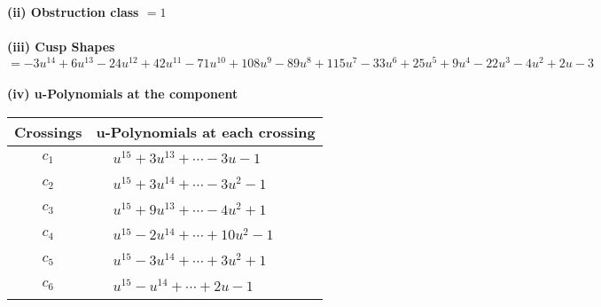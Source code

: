 \documentclass[1p]{elsarticle_modified}
\theoremstyle{definition}
\begin{document}
\flushleft \textbf{(ii) Obstruction class $= 1$}\\~\\
\flushleft \textbf{(iii) Cusp Shapes $= -3 u^{14}+6 u^{13}-24 u^{12}+42 u^{11}-71 u^{10}+108 u^9-89 u^8+115 u^7-33 u^6+25 u^5+9 u^4-22 u^3-4 u^2+2 u-3$}\\~\\
\newpage\renewcommand{\arraystretch}{1}
\flushleft \textbf{(iv) u-Polynomials at the component}\newline \\
\begin{tabular}{m{50pt}|m{274pt}}
Crossings & \hspace{64pt}u-Polynomials at each crossing \\
\hline $$\begin{aligned}c_{1}\end{aligned}$$&$\begin{aligned}
&u^{15}+3 u^{13}+\cdots-3 u-1
\end{aligned}$\\
\hline $$\begin{aligned}c_{2}\end{aligned}$$&$\begin{aligned}
&u^{15}+3 u^{14}+\cdots-3 u^2-1
\end{aligned}$\\
\hline $$\begin{aligned}c_{3}\end{aligned}$$&$\begin{aligned}
&u^{15}+9 u^{13}+\cdots-4 u^2+1
\end{aligned}$\\
\hline $$\begin{aligned}c_{4}\end{aligned}$$&$\begin{aligned}
&u^{15}-2 u^{14}+\cdots+10 u^2-1
\end{aligned}$\\
\hline $$\begin{aligned}c_{5}\end{aligned}$$&$\begin{aligned}
&u^{15}-3 u^{14}+\cdots+3 u^2+1
\end{aligned}$\\
\hline $$\begin{aligned}c_{6}\end{aligned}$$&$\begin{aligned}
&u^{15}- u^{14}+\cdots+2 u-1
\end{aligned}$\\

\end{tabular}
\end{document}

